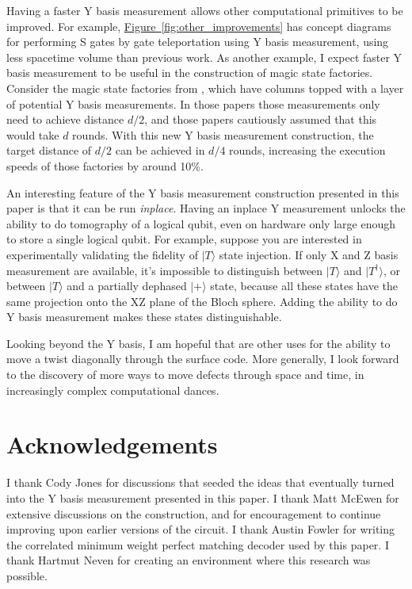 \documentclass[onecolumn,unpublished,a4paper]{quantumarticle}
\theoremstyle{definition}
\theoremstyle{definition}
\theoremstyle{definition}
\newcommand{\fig}[1]{\hyperref[fig:#1]{Figure~\ref*{fig:#1}}}
\begin{document}
Having a faster Y basis measurement allows other computational primitives to be improved.
For example, \fig{other_improvements} has concept diagrams for performing S gates by gate teleportation using Y basis measurement, using less spacetime volume than previous work.
As another example, I expect faster Y basis measurement to be useful in the construction of magic state factories.
Consider the magic state factories from \cite{fowler2018latticesurgery,gidney2019catalyzeddistillation}, which have columns topped with a layer of potential Y basis measurements.
In those papers those measurements only need to achieve distance $d/2$, and those papers cautiously assumed that this would take $d$ rounds.
With this new Y basis measurement construction, the target distance of $d/2$ can be achieved in $d/4$ rounds, increasing the execution speeds of those factories by around 10\%.

An interesting feature of the Y basis measurement construction presented in this paper is that it can be run \emph{inplace}.
Having an inplace Y measurement unlocks the ability to do tomography of a logical qubit, even on hardware only large enough to store a single logical qubit.
For example, suppose you are interested in experimentally validating the fidelity of $|T\rangle$ state injection.
If only X and Z basis measurement are available, it's impossible to distinguish between $|T\rangle$ and $|T^\dagger\rangle$, or between $|T\rangle$ and a partially dephased $|+\rangle$ state, because all these states have the same projection onto the XZ plane of the Bloch sphere.
Adding the ability to do Y basis measurement makes these states distinguishable.

Looking beyond the Y basis, I am hopeful that are other uses for the ability to move a twist diagonally through the surface code.
More generally, I look forward to the discovery of more ways to move defects through space and time, in increasingly complex computational dances.

\section{Acknowledgements}

I thank Cody Jones for discussions that seeded the ideas that eventually turned into the Y basis measurement presented in this paper.
I thank Matt McEwen for extensive discussions on the construction, and for encouragement to continue improving upon earlier versions of the circuit.
I thank Austin Fowler for writing the correlated minimum weight perfect matching decoder used by this paper.
I thank Hartmut Neven for creating an environment where this research was possible.
\end{document}
